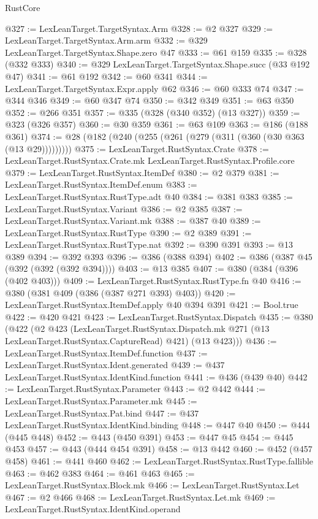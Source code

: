 \begin{lexlean}{RustCore}
\begin{coremodule}
@327 := LexLeanTarget.TargetSyntax.Arm
@328 := @2 @327
@329 := LexLeanTarget.TargetSyntax.Arm.arm
@332 := @329 LexLeanTarget.TargetSyntax.Shape.zero @47
@333 := @61 @159
@335 := @328 (@332 @333)
@340 := @329 LexLeanTarget.TargetSyntax.Shape.succ (@33 @192 @47)
@341 := @61 @192
@342 := @60 @341
@344 := LexLeanTarget.TargetSyntax.Expr.apply @62
@346 := @60 @333 @74
@347 := @344 @346
@349 := @60 @347 @74
@350 := @342 @349
@351 := @63 @350
@352 := @266 @351
@357 := @335 (@328 (@340 @352) (@13 @327))
@359 := @323 (@326 @357)
@360 := @30 @359
@361 := @63 @109
@363 := @186 (@188 @361)
@374 := @28 (@182 (@240 (@255 (@261 (@279 (@311 (@360 (@30 @363 (@13 @29)))))))))
@375 := LexLeanTarget.RustSyntax.Crate
@378 := LexLeanTarget.RustSyntax.Crate.mk LexLeanTarget.RustSyntax.Profile.core
@379 := LexLeanTarget.RustSyntax.ItemDef
@380 := @2 @379
@381 := LexLeanTarget.RustSyntax.ItemDef.enum
@383 := LexLeanTarget.RustSyntax.RustType.adt @40
@384 := @381 @383
@385 := LexLeanTarget.RustSyntax.Variant
@386 := @2 @385
@387 := LexLeanTarget.RustSyntax.Variant.mk
@388 := @387 @40
@389 := LexLeanTarget.RustSyntax.RustType
@390 := @2 @389
@391 := LexLeanTarget.RustSyntax.RustType.nat
@392 := @390 @391
@393 := @13 @389
@394 := @392 @393
@396 := @386 (@388 @394)
@402 := @386 (@387 @45 (@392 (@392 (@392 @394))))
@403 := @13 @385
@407 := @380 (@384 (@396 (@402 @403)))
@409 := LexLeanTarget.RustSyntax.RustType.fn @40
@416 := @380 (@381 @409 (@386 (@387 @271 @393) @403))
@420 := LexLeanTarget.RustSyntax.ItemDef.apply @40 @394 @391
@421 := Bool.true
@422 := @420 @421
@423 := LexLeanTarget.RustSyntax.Dispatch
@435 := @380
    (@422
      (@2
        @423
        (LexLeanTarget.RustSyntax.Dispatch.mk @271 (@13 LexLeanTarget.RustSyntax.CaptureRead) @421)
        (@13 @423)))
@436 := LexLeanTarget.RustSyntax.ItemDef.function
@437 := LexLeanTarget.RustSyntax.Ident.generated
@439 := @437 LexLeanTarget.RustSyntax.IdentKind.function
@441 := @436 (@439 @40)
@442 := LexLeanTarget.RustSyntax.Parameter
@443 := @2 @442
@444 := LexLeanTarget.RustSyntax.Parameter.mk
@445 := LexLeanTarget.RustSyntax.Pat.bind
@447 := @437 LexLeanTarget.RustSyntax.IdentKind.binding
@448 := @447 @40
@450 := @444 (@445 @448)
@452 := @443 (@450 @391)
@453 := @447 @45
@454 := @445 @453
@457 := @443 (@444 @454 @391)
@458 := @13 @442
@460 := @452 (@457 @458)
@461 := @441 @460
@462 := LexLeanTarget.RustSyntax.RustType.fallible
@463 := @462 @383
@464 := @461 @463
@465 := LexLeanTarget.RustSyntax.Block.mk
@466 := LexLeanTarget.RustSyntax.Let
@467 := @2 @466
@468 := LexLeanTarget.RustSyntax.Let.mk
@469 := LexLeanTarget.RustSyntax.IdentKind.operand

\end{coremodule}
\end{lexlean}
